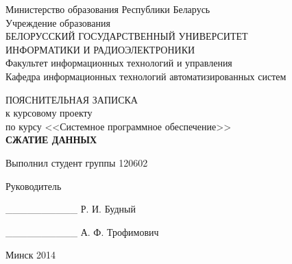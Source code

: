 \begin{titlepage}
\thispagestyle{empty}
\setlength{\parindent}{0mm} %

\begin{center}
  Министерство образования Республики Беларусь \\
  \smallskip
  Учреждение образования \\
  БЕЛОРУССКИЙ ГОСУДАРСТВЕННЫЙ УНИВЕРСИТЕТ \\
  ИНФОРМАТИКИ И РАДИОЭЛЕКТРОНИКИ \\
  \smallskip
  Факультет информационных технологий и управления \\
  \smallskip
  Кафедра информационных технологий автоматизированных систем
\end{center}

\vspace{50mm}

\begin{center}
  ПОЯСНИТЕЛЬНАЯ ЗАПИСКА \\
  к курсовому проекту \\
  по курсу <<Системное программное обеспечение>>\\
  \textbf{СЖАТИЕ ДАННЫХ} \\
\end{center}

\vspace{30mm}

\begin{minipage}{.45\linewidth}
    Выполнил студент группы 120602 

    \smallskip

    Руководитель 
\end{minipage}
\hfill
\begin{minipage}{.45\linewidth}
    \_\_\_\_\_\_\_\_\_\_ Р. И. Будный

    \smallskip

    \_\_\_\_\_\_\_\_\_\_ А. Ф. Трофимович 
\end{minipage}

\vspace{65mm}
\begin{center}
  Минск 2014
\end{center}

\setlength{\parindent}{5ex} %
\end{titlepage}